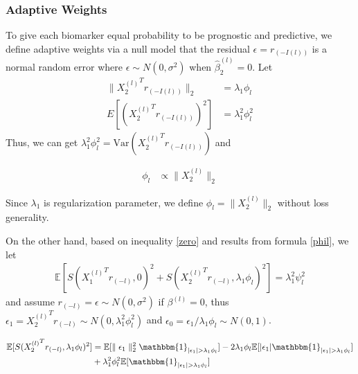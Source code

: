 \documentclass[12pt]{article}
\begin{document}
\subsubsection{Adaptive Weights}

To give each biomarker equal probability to be prognostic and predictive,
we define adaptive weights via a null model that the residual $\epsilon=r_{(-I(l))}$ 
is a normal random error where $\epsilon\sim N(0,\sigma^2)$ when $\hat{\beta}_2^{(l)}=0$.
Let
\begin{equation} \label{phil}
  \begin{split}
  \parallel {X_2^{(l)}}^T r_{(-I(l))} \parallel_2 & = \lambda_1\phi_l \\
  E[( {X_2^{(l)}}^T r_{(-I(l))})^2] & = \lambda_1^2\phi_l^2
\end{split}
\end{equation}
Thus, we can get $\lambda_1^2\phi_l^2 = \text{Var}( {X_2^{(l)}}^T r_{(-I(l))})$ and 

\begin{align}
  \phi_l & \propto \parallel X_2^{(l)} \parallel_2 
\end{align}

Since $\lambda_1$ is regularization parameter, we define $\phi_l=\parallel X_2^{(l)} \parallel_2$
without loss generality.

On the other hand, based on inequality \ref{zero} and results from formula \ref{phil}, we let
\begin{align}
  \mathbb{E} [ S( {X_1^{(l)}}^T r_{(-l)},0)^2+S( {X_2^{(l)}}^T r_{(-l)},\lambda_1\phi_l)^2  ] = \lambda_1^2\psi_l^2
\end{align}
and assume $ r_{(-l)} = \epsilon  \sim N(0,\sigma^2)$ if $\beta^{(l)}=0$, thus $\epsilon_1= {X_2^{(l)}}^T r_{(-l)} \sim N(0,\lambda_1^2\phi_l^2)$ and 
$\epsilon_0=\epsilon_1/\lambda_1\phi_l\sim N(0,1)$.



\begin{equation} \label{equ_1}
  \begin{split}
 \mathbb{E}[S( {X_2^{(l)}}^T r_{(-l)},\lambda_1\phi_l)^2] &  =  \mathbb{E}[\parallel \epsilon_1 \parallel_2^2 \mathbbm{1}_{|\epsilon_1|>\lambda_1\phi_l}]-2\lambda_1\phi_l\mathbb{E}[|\epsilon_1|\mathbbm{1}_{|\epsilon_1|>\lambda_1\phi_l}]  \\
  &  + \lambda_1^2\phi_l^2\mathbb{E}[\mathbbm{1}_{|\epsilon_1|>\lambda_1\phi_l}] \\
\end{split}
\end{equation}
  
\end{document}
